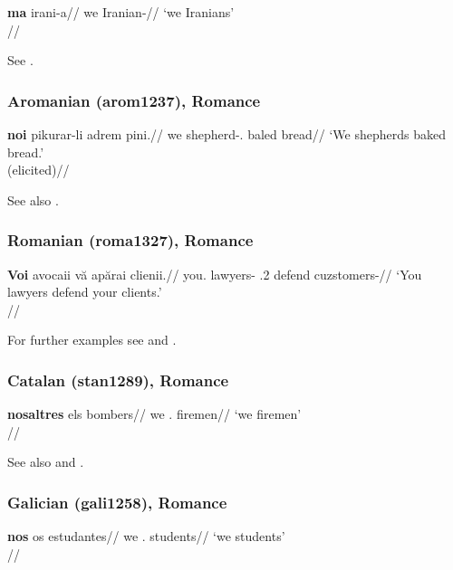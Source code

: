 \ex 
\begingl
\gla \textbf{ma} irani-a//
\glb we Iranian-\Pl//
\glft `we Iranians'\\\citep[212, (356)]{mahootian1997}//
\endgl
\xe

See \citet[209, 212]{mahootian1997}.

\subsubsection{Aromanian (arom1237), Romance}

\ex \begingl
\gla \textbf{noi} pikurar-li adrem pini.//
\glb we shepherd-\Def.\Pl{} baled bread//
\glft `We shepherds baked bread.'\\(elicited)//
\endgl
\xe

See also \citet[560]{hoehn2015unagr}. 

\subsubsection{Romanian (roma1327), Romance}

\ex \begingl
\gla \textbf{Voi} avocaii v\u{a} ap\u{a}rai clienii.//
\glb you.\Pl{} lawyers-\Def{} \Cl.2\Pl{} defend cuzstomers-\Def{}//
\glft `You lawyers defend your clients.'\\\citep[10, (20a)]{cornilescunicolae2014}//
\endgl
\xe

For further examples see \citet[255, 258]{mallinson1986} and \citet[6, 10, 20f.]{cornilescunicolae2014}.

\subsubsection{Catalan (stan1289), Romance}

\ex \begingl
\gla \textbf{nosaltres} els bombers//
\glb we \Det.\Pl{} firemen//
\glft `we firemen'\\\citep[290]{hualde1992catalan}//
\endgl
\xe 

See also \citet[287, 290]{hualde1992catalan} and \citet[560]{hoehn2015unagr}.

\subsubsection{Galician (gali1258), Romance}

\ex
\begingl
\gla \textbf{nos} os estudantes//
\glb we \Det.\Pl{} students//
\glft `we students'\\\citep[560, (36a)]{hoehn2015unagr}//
\endgl
\xe

